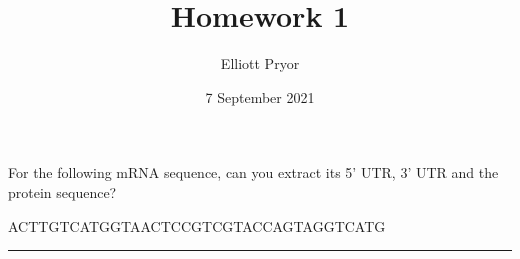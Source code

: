 \documentclass[12pt]{article}
\title{Homework 1}
\author{Elliott Pryor}
\date{7 September 2021}
\begin{document}
\maketitle



For the following mRNA sequence, can you extract its 5’ UTR, 3’ UTR
and the protein sequence?

ACTTGTCATGGTAACTCCGTCGTACCAGTAGGTCATG

\hrule
\end{document}
